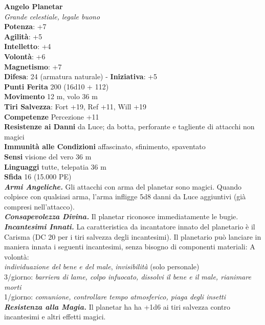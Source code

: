 \begin{multicols}{2}
\medskip\textbf{Angelo Planetar}\\
\emph{Grande celestiale, legale buono}\\
\textbf{Potenza}: +7\\
\textbf{Agilità}: +5\\
\textbf{Intelletto}: +4\\
\textbf{Volontà}: +6\\
\textbf{Magnetismo}: +7\\
\textbf{Difesa}: 24 (armatura naturale) - \textbf{Iniziativa}: +5\\
\textbf{Punti Ferita} 200 (16d10 + 112)\\
\textbf{Movimento} 12 m, volo 36 m\\
\textbf{Tiri Salvezza}: Fort +19, Ref +11, Will +19\\
\textbf{Competenze} Percezione +11\\
\textbf{Resistenze ai Danni} da Luce; da botta, perforante e tagliente di attacchi non magici\\
\textbf{Immunità alle Condizioni} affascinato, sfinimento, spaventato\\
\textbf{Sensi} visione del vero 36 m\\
\textbf{Linguaggi} tutte, telepatia 36 m\\
\textbf{Sfida} 16 (15.000 PE)\smallskip\\
\emph{\textbf{Armi Angeliche.}} Gli attacchi con arma del planetar sono magici. Quando colpisce con qualsiasi arma, l'arma infligge 5d8 danni da Luce aggiuntivi (già compresi nell'attacco).\\
\emph{\textbf{Consapevolezza Divina.}} Il planetar riconosce immediatamente le bugie.\\
\emph{\textbf{Incantesimi Innati.}} La caratteristica da incantatore innato del planetario è il Carisma (DC 20 per i tiri salvezza degli incantesimi). Il planetario può lanciare in maniera innata i seguenti incantesimi, senza bisogno di componenti materiali: A volontà:\\
\emph{individuazione del bene e del male}, \emph{invisibilità} (solo personale)\\
3/giorno: \emph{barriera di lame, colpo infuocato, dissolvi il bene e il} \emph{male, rianimare morti}\\
1/giorno: \emph{comunione, controllare tempo atmosferico, piaga degli insetti}\\
\emph{\textbf{Resistenza alla Magia.}} Il planetar ha ha +1d6 ai tiri salvezza contro incantesimi e altri effetti magici.\\

\end{multicols}
